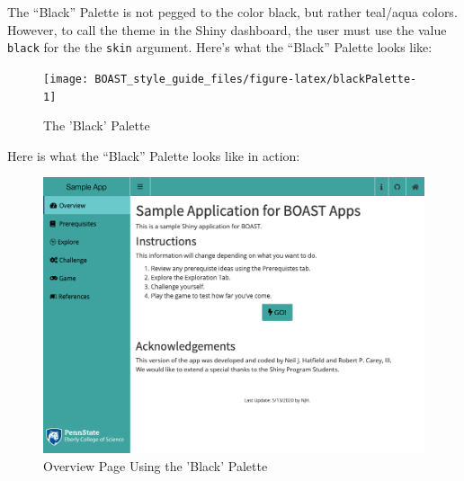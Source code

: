 \documentclass[
]{book}
\begin{document}
The ``Black'' Palette is not pegged to the color black, but rather teal/aqua colors. However, to call the theme in the Shiny dashboard, the user must use the value \texttt{black} for the the \texttt{skin} argument. Here's what the ``Black'' Palette looks like:

\begin{figure}

{\centering \texttt{[image: BOAST\_style\_guide\_files/figure-latex/blackPalette-1]} 

}

\caption{The 'Black' Palette}\label{fig:blackPalette}
\end{figure}

Here is what the ``Black'' Palette looks like in action:

\begin{figure}

{\centering \includegraphics[width=14in]{images/colorThemes/blackOverview} 

}

\caption{Overview Page Using the 'Black' Palette}\label{fig:blackAction1}
\end{figure}
\end{document}
